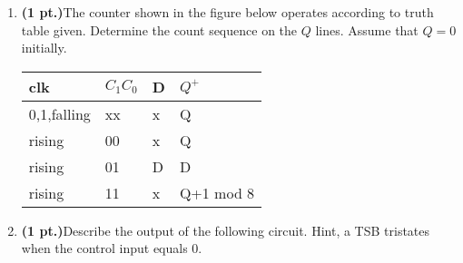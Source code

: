 \documentclass{article}
\begin{document}
\begin{enumerate}
\pagebreak{}
\item {\bf (1 pt.)}The counter shown in the figure below operates according to
truth table given.  Determine the count sequence on the
$Q$ lines.  Assume that $Q=0$ initially.

\begin{tabular}{l|l|l||l}
clk & $C_1 C_0$ & D & $Q^+$ \\ \hline
0,1,falling & xx & x & Q \\ \hline
rising & 00 & x & Q \\  \hline
rising & 01 & D & D \\  \hline
rising & 11 & x & Q+1 mod 8 \\ 
\end{tabular}

\item {\bf (1 pt.)}Describe the output of the following circuit.
Hint, a TSB tristates when the control input equals 0.


\end{enumerate}
\end{document}
